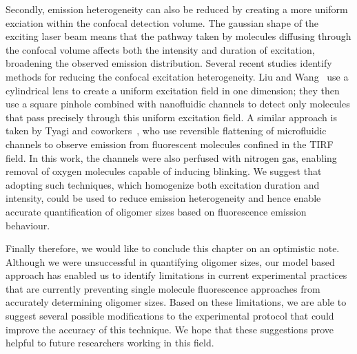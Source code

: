 Secondly, emission heterogeneity can also be reduced by creating a more uniform exciation within the confocal detection volume. The gaussian shape of the exciting laser beam means that the pathway taken by molecules diffusing through the confocal volume affects both the intensity and duration of excitation, broadening the observed emission distribution. Several recent studies identify methods for reducing the confocal excitation heterogeneity. Liu and Wang~\cite{liu2008} use a cylindrical lens to create a uniform excitation field in one dimension; they then use a square pinhole combined with nanofluidic channels to detect only molecules that pass precisely through this uniform excitation field. A similar approach is taken by Tyagi and coworkers~\cite{tyagi2014}, who use reversible flattening of microfluidic channels to observe emission from fluorescent molecules confined in the TIRF field. In this work, the channels were also perfused with nitrogen gas, enabling removal of oxygen molecules capable of inducing blinking. We suggest that adopting such techniques, which homogenize both excitation duration and intensity, could be used to reduce emission heterogeneity and hence enable accurate quantification of oligomer sizes based on fluorescence emission behaviour.

Finally therefore, we would like to conclude this chapter on an optimistic note. Although we were unsuccessful in quantifying oligomer sizes, our model based approach has enabled us to identify limitations in current experimental practices that are currently preventing single molecule fluorescence approaches from accurately determining oligomer sizes. Based on these limitations, we are able to suggest several possible modifications to the experimental protocol that could improve the accuracy of this technique. We hope that these suggestions prove helpful to future researchers working in this field. 